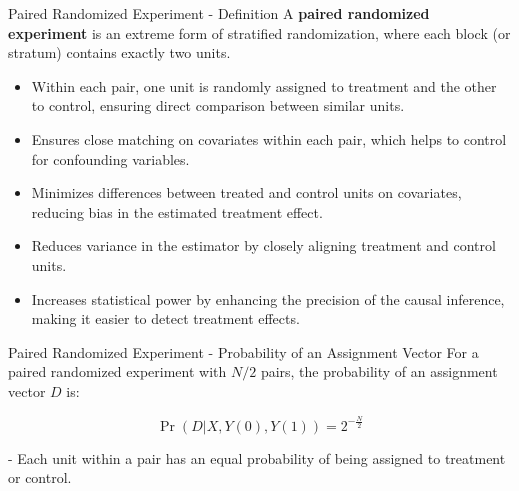 \documentclass[xcolor=svgnames,t]{beamer}
\begin{document}
\begin{frame}{Paired Randomized Experiment - Definition}
    A \textbf{paired randomized experiment} is an extreme form of stratified randomization, where each block (or stratum) contains exactly two units.
    
    \begin{itemize}[<+->]
        \item Within each pair, one unit is randomly assigned to treatment and the other to control, ensuring direct comparison between similar units.
        \item Ensures close matching on covariates within each pair, which helps to control for confounding variables.
        \item Minimizes differences between treated and control units on covariates, reducing bias in the estimated treatment effect.
        \item Reduces variance in the estimator by closely aligning treatment and control units.
        \item Increases statistical power by enhancing the precision of the causal inference, making it easier to detect treatment effects.
    \end{itemize}
\end{frame}

\begin{frame}{Paired Randomized Experiment - Probability of an Assignment Vector}
    For a paired randomized experiment with \( N/2 \) pairs, the probability of an assignment vector \( D \) is:

    \[
    \Pr(D | X, Y(0), Y(1)) = 2^{-\frac{N}{2}}
    \]

    - Each unit within a pair has an equal probability of being assigned to treatment or control.
\end{frame}
\end{document}
